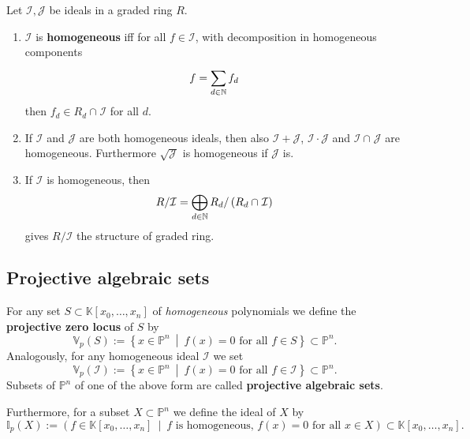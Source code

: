 \begin{lem}
	Let $\mathcal{I}, \mathcal{J}$ be ideals in a graded ring $R$.
	\begin{enumerate}
		\item $\mathcal{I}$ is \textbf{homogeneous} iff for all $f \in \mathcal{I}$, with decomposition in homogeneous components
			 \begin{equation}
			f = \sum_{d \in \mathbb{N}}^{} f_d
			\end{equation} 
			then $f_d \in R_d \cap_{} \mathcal{I}$ for all $d$.
		\item If $\mathcal{I}$ and $\mathcal{J}$ are both homogeneous ideals, then also $\mathcal{I} + \mathcal{J}$, $\mathcal{I} \cdot \mathcal{J}$ and $\mathcal{I} \cap_{} \mathcal{J}$ are homogeneous.
			Furthermore $\sqrt{\mathcal{J}}$ is homogeneous if $\mathcal{J}$ is.
		\item If $\mathcal{I}$ is homogeneous, then
			 \begin{equation}
				 R/\mathcal{I} = \bigoplus_{d \in \mathbb{N}} R_d / \left( R_d \cap_{} \mathcal{I} \right)
			\end{equation} 
			gives $R/\mathcal{I}$ the structure of graded ring.
	\end{enumerate}
\end{lem} 

\subsection{Projective algebraic sets}
\begin{defn}
	For any set $S \subset \mathbb{K}\left[x_0, \ldots, x_n \right]$ of \textit{homogeneous} polynomials we define the  \textbf{projective zero locus} of $S$ by
	\begin{equation}
		\mathbb{V}_p\left( S \right) := \left\{ x \in \mathbb{P}^n \ \middle|\ f(x) = 0 \text{ for all } f \in S \right\} \subset \mathbb{P}^n
	.\end{equation} 
	Analogously, for any homogeneous ideal $\mathcal{I}$ we set
	\begin{equation}
		\mathbb{V}_p\left( \mathcal{I} \right) := \left\{ x \in \mathbb{P}^n \ \middle|\ f(x) = 0 \text{ for all } f \in \mathcal{I} \right\} \subset \mathbb{P}^n
	.\end{equation} 
	Subsets of $\mathbb{P}^n$ of one of the above form are called \textbf{projective algebraic sets}.

	Furthermore, for a subset $X \subset \mathbb{P}^n$ we define the ideal of $X$ by
	\begin{equation}
		\mathbb{I}_p(X) := \left( f \in \mathbb{K}\left[x_0, \ldots, x_n \right] \ \middle|\ f \text{ is homogeneous, } f(x) = 0 \text{ for all } x \in X \right) \subset \mathbb{K}\left[x_0, \ldots, x_n \right]
	.\end{equation} 
\end{defn}

